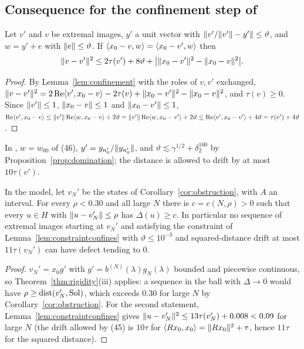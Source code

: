 \subsection{Consequence for the confinement step of \paper{}}

\begin{lemma}\label{lem:constraintconfines}\stproved{}
Let $v'$ and $v$ be extremal images, $y'$ a unit vector with
$\lVert v'/\lVert v'\rVert-y'\rVert\le\vartheta$, and $w=y'+e$ with $\lVert e\rVert\le\vartheta$. If
$\langle x_0-v,w\rangle=\langle x_0-v',w\rangle$ then
\[
\lVert v-v'\rVert^2\le2\tau(v')+8\vartheta+\bigl|\lVert x_0-v'\rVert^2-\lVert x_0-v\rVert^2\bigr| .
\]
\end{lemma}
\begin{proof}
By Lemma~\ref{lem:confinement} with the roles of $v,v'$ exchanged,
$\lVert v-v'\rVert^2=2\operatorname{Re}\langle v',x_0-v\rangle-2\tau(v)+\lVert x_0-v'\rVert^2-\lVert x_0-v\rVert^2$, and $\tau(v)\ge0$.
Since $\lVert v'\rVert\le1$, $\lVert x_0-v\rVert\le1$ and $\lVert x_0-v'\rVert\le1$,
$\operatorname{Re}\langle v',x_0-v\rangle\le\lVert v'\rVert\operatorname{Re}\langle w,x_0-v\rangle+2\vartheta
=\lVert v'\rVert\operatorname{Re}\langle w,x_0-v'\rangle+2\vartheta\le\operatorname{Re}\langle v',x_0-v'\rangle+4\vartheta=\tau(v')+4\vartheta$.
\end{proof}

In \paper{}, $w=w_{00}$ of (46), $y'=y_{n_0'}/\lVert y_{n_0'}\rVert$, and
$\vartheta\lesssim\gamma^{1/2}+\delta_2^{100}$ by Proposition~\ref{prop:domination}; the
distance is allowed to drift by at most $10\tau(v')$.

\begin{theorem}\label{thm:nogo}\stproved{}
In the model, let $v_N'$ be the states of Corollary~\ref{cor:obstruction}, with $A$ an interval.
For every $\rho<0.30$ and all large $N$ there is $c=c(N,\rho)>0$ such that every $u\in H$ with
$\lVert u-v_N'\rVert\le\rho$ has $\Delta(u)\ge c$. In particular no sequence of extremal images
starting at $v_N'$ and satisfying the constraint of Lemma~\ref{lem:constraintconfines} with
$\vartheta\le10^{-3}$ and squared-distance drift at most $11\tau(v_N')$ can have defect tending
to $0$.
\end{theorem}
\begin{proof}
$v_N'=x_0g'$ with $g'=b^{(N)}(\lambda)g_N(\lambda)$ bounded and piecewise continuous, so
Theorem~\ref{thm:rigidity}(iii) applies: a sequence in the ball with $\Delta\to0$ would have
$\rho\ge\operatorname{dist}(v_N',\operatorname{Sol})$, which exceeds $0.30$ for large $N$ by
Corollary~\ref{cor:obstruction}. For the second statement, Lemma~\ref{lem:constraintconfines}
gives $\lVert u-v_N'\rVert^2\le13\tau(v_N')+0.008<0.09$ for large $N$ (the drift allowed by
\paper{} (45) is $10\tau$ for $\langle Rx_0,x_0\rangle=\lVert Rx_0\rVert^2+\tau$, hence $11\tau$ for the squared
distance).
\end{proof}

